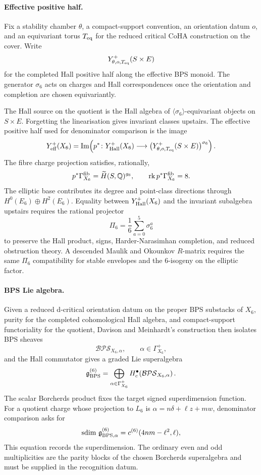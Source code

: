 \paragraph{Effective positive half.}
Fix a stability chamber $\theta$, a compact-support convention, an
orientation datum $o$, and an equivariant torus $T_{\mathrm{eq}}$ for the reduced
critical CoHA construction on the cover. Write
\[
  Y^{+}_{\theta,o,T_{\mathrm{eq}}}(S\times E)
\]
for the completed Hall positive half along the effective BPS monoid.
The generator $\sigma_6$ acts on charges and Hall correspondences once
the orientation and completion are chosen equivariantly.

The Hall source on the quotient is the Hall algebra of
$\langle\sigma_6\rangle$-equivariant objects on $S\times E$. Forgetting
the linearisation gives invariant classes upstairs. The effective
positive half used for denominator comparison is the image
\begin{equation}
   Y^{+}_{\mathrm{eff}}(X_6)
   =
   \operatorname{Im}\!\left(
     p^*\colon
     Y^{+}_{\mathrm{Hall}}(X_6)
     \longrightarrow
     \bigl(Y^{+}_{\theta,o,T_{\mathrm{eq}}}(S\times E)\bigr)^{\sigma_6}
   \right).
   \label{n6:eq:Meff}
\end{equation}
The fibre charge projection satisfies, rationally,
\[
   p^*\Gamma^{\mathrm{fib}}_{X_6}
   =
   \widetilde H(S,\mathbb{Q})^{g_6},
   \qquad
   \operatorname{rk}p^*\Gamma^{\mathrm{fib}}_{X_6}=8.
\]
The elliptic base contributes its degree and point-class directions
through $H^0(E_6)\oplus H^2(E_6)$. Equality between
$Y^{+}_{\mathrm{Hall}}(X_6)$ and the invariant subalgebra upstairs requires the
rational projector
\[
  \Pi_6=\frac{1}{6}\sum_{a=0}^{5}\sigma_6^a
\]
to preserve the Hall product, signs, Harder-Narasimhan completion, and
reduced obstruction theory. A descended Maulik and Okounkov $R$-matrix
requires the same $\Pi_6$ compatibility for stable envelopes and the
$6$-isogeny on the elliptic factor.

\paragraph{BPS Lie algebra.}
Given a reduced d-critical orientation datum on the proper BPS
substacks of $X_6$, purity for the completed cohomological Hall algebra,
and compact-support functoriality for the quotient, Davison and
Meinhardt's construction then isolates BPS sheaves
\[
  \mathcal{BPS}_{X_6,\alpha},
  \qquad
  \alpha\in\Gamma^+_{X_6},
\]
and the Hall commutator gives a graded Lie superalgebra
\[
   \mathfrak{g}^{(6)}_{\mathrm{BPS}}
   =
   \bigoplus_{\alpha\in\Gamma^+_{X_6}}
   H^\bullet_c\!\left(\mathcal{BPS}_{X_6,\alpha}\right).
\]
The scalar Borcherds product fixes the target signed superdimension
function. For a quotient charge whose projection to $L_6$ is
$\alpha=n\delta+\ell z+mw$, denominator comparison asks for
\begin{equation}
   \operatorname{sdim}\,\mathfrak{g}^{(6)}_{\mathrm{BPS},\alpha}
   =
   c^{(6)}(4nm-\ell^2,\ell),
   \label{n6:eq:root-sdim}
\end{equation}
This equation records the superdimension. The ordinary even and odd
multiplicities are the parity blocks of the chosen Borcherds
superalgebra and must be supplied in the recognition datum.

